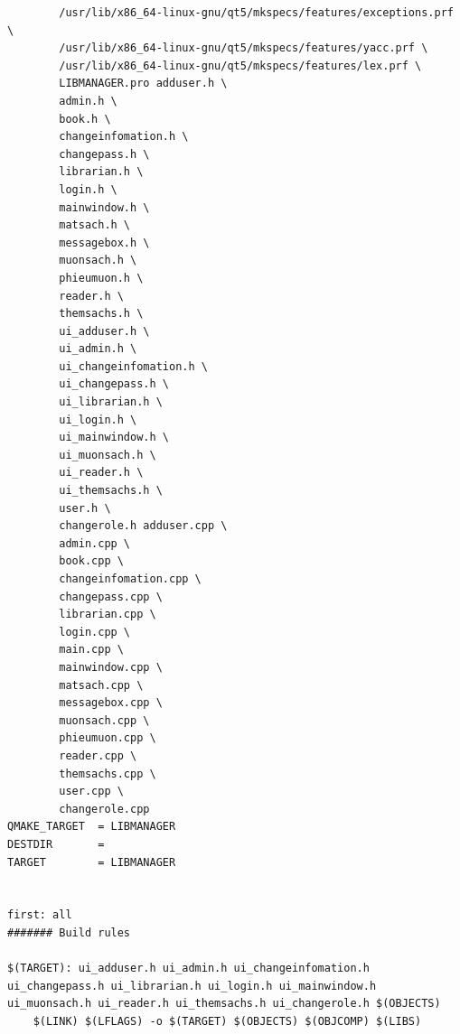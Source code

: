 \documentclass[a4paper]{article}
\begin{document}
\begin{verbatim}
		/usr/lib/x86_64-linux-gnu/qt5/mkspecs/features/exceptions.prf \
		/usr/lib/x86_64-linux-gnu/qt5/mkspecs/features/yacc.prf \
		/usr/lib/x86_64-linux-gnu/qt5/mkspecs/features/lex.prf \
		LIBMANAGER.pro adduser.h \
		admin.h \
		book.h \
		changeinfomation.h \
		changepass.h \
		librarian.h \
		login.h \
		mainwindow.h \
		matsach.h \
		messagebox.h \
		muonsach.h \
		phieumuon.h \
		reader.h \
		themsachs.h \
		ui_adduser.h \
		ui_admin.h \
		ui_changeinfomation.h \
		ui_changepass.h \
		ui_librarian.h \
		ui_login.h \
		ui_mainwindow.h \
		ui_muonsach.h \
		ui_reader.h \
		ui_themsachs.h \
		user.h \
		changerole.h adduser.cpp \
		admin.cpp \
		book.cpp \
		changeinfomation.cpp \
		changepass.cpp \
		librarian.cpp \
		login.cpp \
		main.cpp \
		mainwindow.cpp \
		matsach.cpp \
		messagebox.cpp \
		muonsach.cpp \
		phieumuon.cpp \
		reader.cpp \
		themsachs.cpp \
		user.cpp \
		changerole.cpp
QMAKE_TARGET  = LIBMANAGER
DESTDIR       = 
TARGET        = LIBMANAGER


first: all
####### Build rules

$(TARGET): ui_adduser.h ui_admin.h ui_changeinfomation.h 
ui_changepass.h ui_librarian.h ui_login.h ui_mainwindow.h 
ui_muonsach.h ui_reader.h ui_themsachs.h ui_changerole.h $(OBJECTS)  
	$(LINK) $(LFLAGS) -o $(TARGET) $(OBJECTS) $(OBJCOMP) $(LIBS)


\end{verbatim}
\end{document}

